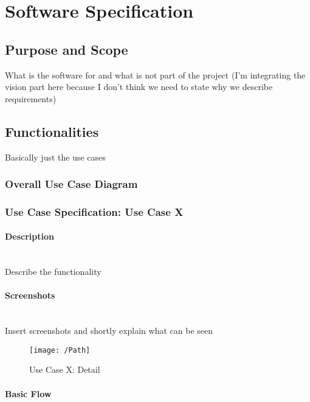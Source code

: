 
\section{Software Specification}
\label{sec:domainB}

\subsection{Purpose and Scope}
\label{sec:domainBa}
What is the software for and what is not part of the project (I'm integrating the vision part here because I don't think we need to state why we describe requirements)

\subsection{Functionalities}
\label{sec:domainBb}
Basically just the use cases

\subsubsection{Overall Use Case Diagram}
\label{sec:domainBba}

\subsubsection{Use Case Specification: Use Case X}
\label{sec:domainBbb}

\paragraph{Description}\mbox{}\\
Describe the functionality

\paragraph{Screenshots}\mbox{}\\
Insert screenshots and shortly explain what can be seen
\begin{figure}[h] 
	\centering
	\texttt{[image: /Path]}
	\caption{Use Case X: Detail}
	\label{fig:useCaseXDetailY}
\end{figure}

\paragraph{Basic Flow} \mbox{}\\

